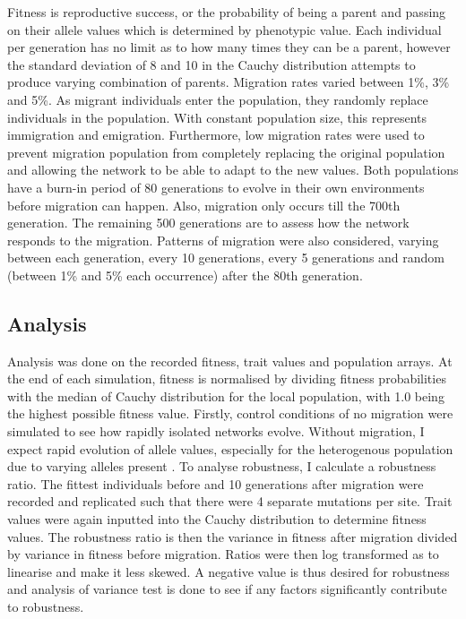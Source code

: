 Fitness is reproductive success, or the probability of being a parent and passing on their allele values which is determined by phenotypic value. Each individual per generation has no limit as to how many times they can be a parent, however the standard deviation of 8 and 10 in the Cauchy distribution attempts to produce varying combination of parents. Migration rates varied between 1\%, 3\% and 5\%. As migrant individuals enter the population, they randomly replace individuals in the population. With constant population size, this represents immigration and emigration. Furthermore, low migration rates were used to prevent migration population from completely replacing the original population and allowing the network to be able to adapt to the new values. Both populations have a burn-in period of 80 generations to evolve in their own environments before migration can happen. Also, migration only occurs till the 700th generation. The remaining 500 generations are to assess how the network responds to the migration. Patterns of migration were also considered, varying between each generation, every 10 generations, every 5 generations and random (between 1\% and 5\% each occurrence) after the 80th generation.
\subsection{Analysis}
Analysis was done on the recorded fitness, trait values and population arrays. At the end of each simulation, fitness is normalised by dividing fitness probabilities with the median of Cauchy distribution for the local population, with 1.0 being the highest possible fitness value. Firstly, control conditions of no migration were simulated to see how rapidly isolated networks evolve. Without migration, I expect rapid evolution of allele values, especially for the heterogenous population due to varying alleles present \cite{garcia1997genetic}. To analyse robustness, I calculate a robustness ratio. The fittest individuals before and 10 generations after migration were recorded and replicated such that there were 4 separate mutations per site. Trait values were again inputted into the Cauchy distribution to determine fitness values. The robustness ratio is then the variance in fitness after migration divided by variance in fitness before migration. Ratios were then log transformed as to linearise and make it less skewed. A negative value is thus desired for robustness and analysis of variance test is done to see if any factors significantly contribute to robustness.
